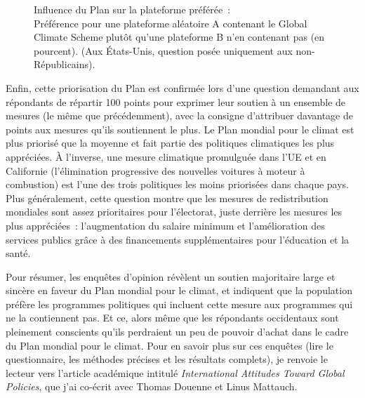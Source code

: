 \documentclass[a5paper,french]{memoir}
\begin{document}
\begin{figure}[h!] %
  \caption[Influence du Plan sur la plateforme préférée]{Influence du Plan sur la plateforme préférée~:\\ Préférence pour une plateforme aléatoire A contenant le Global Climate Scheme plutôt qu'une plateforme B n'en contenant pas (en pourcent). (Aux États-Unis, question posée uniquement aux non-Républicains).}\label{fig:conjoint_left_ag_b}
\end{figure}

Enfin, cette priorisation du Plan est confirmée lors d'une question demandant aux répondants de répartir 100 points pour exprimer leur soutien à un ensemble de mesures (le même que précédemment), avec la consigne d'attribuer davantage de points aux mesures qu'ils soutiennent le plus. Le Plan mondial pour le climat est plus priorisé que la moyenne et fait partie des politiques climatiques les plus appréciées. À l'inverse, une mesure climatique promulguée dans l'UE et en Californie (l'élimination progressive des nouvelles voitures à moteur à combustion) est l'une des trois politiques les moins priorisées dans chaque pays. Plus généralement, cette question montre que les mesures de redistribution mondiales sont assez prioritaires pour l'électorat, juste derrière les mesures les plus appréciées~: l'augmentation du salaire minimum et l'amélioration des services publics grâce à des financements supplémentaires pour l'éducation et la santé.

Pour résumer, les enquêtes d'opinion révèlent un soutien majoritaire large et sincère en faveur du Plan mondial pour le climat, et indiquent que la population préfère les programmes politiques qui incluent cette mesure aux programmes qui ne la contiennent pas. Et ce, alors même que les répondants occidentaux sont pleinement conscients qu'ils perdraient un peu de pouvoir d'achat dans le cadre du Plan mondial pour le climat. Pour en savoir plus sur ces enquêtes (lire le questionnaire, les méthodes précises et les résultats complets), je renvoie le lecteur vers l'article académique intitulé \textit{International Attitudes Toward Global Policies}, que j'ai co-écrit avec Thomas Douenne et Linus Mattauch. 
\end{document}
